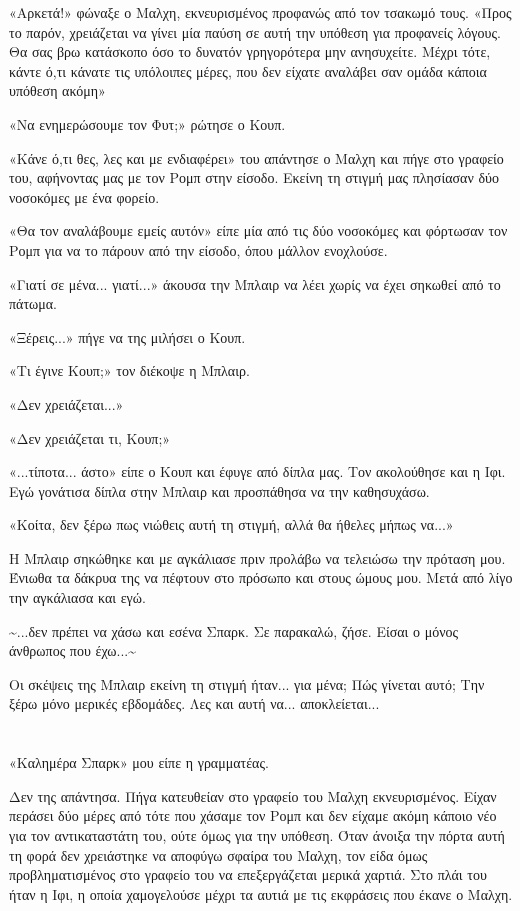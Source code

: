 \documentclass[12pt,twoside, openany]{book}
\begin{document}
«Αρκετά!» φώναξε ο Μαλχη, εκνευρισμένος προφανώς από τον τσακωμό τους. «Προς το παρόν, χρειάζεται να γίνει μία παύση σε αυτή την υπόθεση για προφανείς λόγους. Θα σας βρω κατάσκοπο όσο το δυνατόν γρηγορότερα μην ανησυχείτε. Μέχρι τότε, κάντε ό,τι κάνατε τις υπόλοιπες μέρες, που δεν είχατε αναλάβει σαν ομάδα κάποια υπόθεση ακόμη»

«Να ενημερώσουμε τον Φυτ;» ρώτησε ο Κουπ.

«Κάνε ό,τι θες, λες και με ενδιαφέρει» του απάντησε ο Μαλχη και πήγε στο γραφείο του, αφήνοντας μας με τον Ρομπ στην είσοδο. Εκείνη τη στιγμή μας πλησίασαν δύο νοσοκόμες με ένα φορείο.

«Θα τον αναλάβουμε εμείς αυτόν» είπε μία από τις δύο νοσοκόμες και φόρτωσαν τον Ρομπ για να το πάρουν από την είσοδο, όπου μάλλον ενοχλούσε.

«Γιατί σε μένα... γιατί...» άκουσα την Μπλαιρ να λέει χωρίς να έχει σηκωθεί από το πάτωμα.

«Ξέρεις...» πήγε να της μιλήσει ο Κουπ.

«Τι έγινε Κουπ;» τον διέκοψε η Μπλαιρ.

«Δεν χρειάζεται...»

«Δεν χρειάζεται τι, Κουπ;»

«...τίποτα... άστο» είπε ο Κουπ και έφυγε από δίπλα μας. Τον ακολούθησε και η Ιφι. Εγώ γονάτισα δίπλα στην Μπλαιρ και προσπάθησα να την καθησυχάσω.

«Κοίτα, δεν ξέρω πως νιώθεις αυτή τη στιγμή, αλλά θα ήθελες μήπως να...»

Η Μπλαιρ σηκώθηκε και με αγκάλιασε πριν προλάβω να τελειώσω την πρόταση μου. Ένιωθα τα δάκρυα της να πέφτουν στο πρόσωπο και στους ώμους μου. Μετά από λίγο την αγκάλιασα και εγώ.

\textasciitilde ...δεν πρέπει να χάσω και εσένα Σπαρκ. Σε παρακαλώ, ζήσε. Είσαι ο μόνος άνθρωπος που έχω...\textasciitilde 

Οι σκέψεις της Μπλαιρ εκείνη τη στιγμή ήταν... για μένα; Πώς γίνεται αυτό; Την ξέρω μόνο μερικές εβδομάδες. Λες και αυτή να... αποκλείεται...

\chapter{}

«Καλημέρα Σπαρκ» μου είπε η γραμματέας.

Δεν της απάντησα. Πήγα κατευθείαν στο γραφείο του Μαλχη εκνευρισμένος. Είχαν περάσει δύο μέρες από τότε που χάσαμε τον Ρομπ και δεν είχαμε ακόμη κάποιο νέο για τον αντικαταστάτη του, ούτε όμως για την υπόθεση. Όταν άνοιξα την πόρτα αυτή τη φορά δεν χρειάστηκε να αποφύγω σφαίρα του Μαλχη, τον είδα όμως προβληματισμένος στο γραφείο του να επεξεργάζεται μερικά χαρτιά. Στο πλάι του ήταν η Ιφι, η οποία χαμογελούσε μέχρι τα αυτιά με τις εκφράσεις που έκανε ο Μαλχη.
\end{document}
